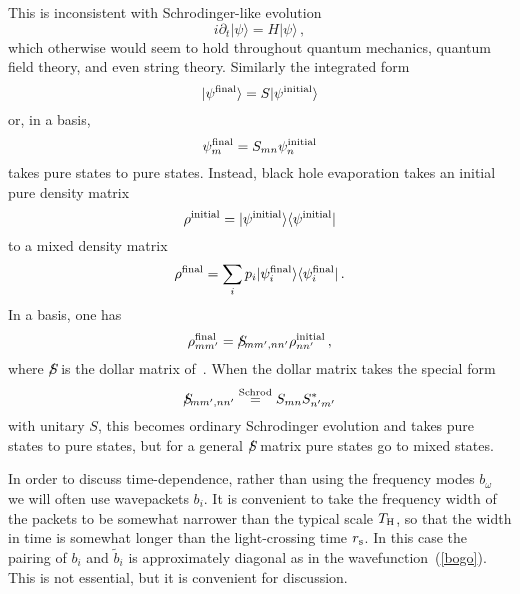\documentclass[12pt]{article}
\newcommand{\be}{\begin{equation}}
\newcommand{\ee}{\end{equation}}
\newcommand{\rmx}{\rm}
\newcommand{\rs}{r_{\rmx s}}
\begin{document}
This is inconsistent with Schrodinger-like evolution
\be
i \partial_t | \psi \rangle = H | \psi \rangle \,, \label{schrod}
\ee
which otherwise would seem to hold throughout quantum mechanics, quantum field theory, and even string theory.  Similarly the integrated form 
\be
| \psi^{\rm final} \rangle = S | \psi^{\rm initial} \rangle
\ee
or, in a basis,
\be
\psi^{\rm final}_m = S_{mn} \psi^{\rm initial}_n
\ee
takes pure states to pure states.  Instead, black hole evaporation takes an initial pure density matrix
\be
\rho^{\rm initial} = | \psi^{\rm initial} \rangle \langle \psi^{\rm initial} |
\ee
to a mixed density matrix
\be
\rho^{\rm final} = \sum_i p_i  | \psi_i^{\rm final} \rangle \langle \psi_i^{\rm final} | \,.
\ee
In a basis, one has
\be
\rho^{\rmx final}_{mm'} = S \hspace{-7pt} /_{mm',nn'}\rho^{\rmx initial}_{nn'} \,,
\ee 
where $S \hspace{-7pt} /$ is the dollar matrix of~\cite{Hawking:1976ra}.
When the dollar matrix takes the special form 
\be
S \hspace{-7pt} /_{mm',nn'} \stackrel{\rmx Schrod}{=} S_{mn} S_{n'm'}^*  \label{purity}
\ee
with unitary $S$,  this becomes ordinary Schrodinger evolution and takes pure states to pure states, but for a general $S \hspace{-7pt}/$ matrix pure states go to mixed states.



In order to discuss time-dependence, rather than using the frequency modes $b_\omega$ we will often use wavepackets $b_i$.  It is convenient to take the frequency width of the packets to be somewhat narrower than the typical scale $T_{\rmx H}$, so that the width in time is somewhat longer than the light-crossing time $\rs$.  In this case the pairing of $b_i$ and $\tilde b_i$ is approximately diagonal as in the wavefunction~(\ref{bogo}).  This is not essential, but it is convenient for discussion.
\end{document}
